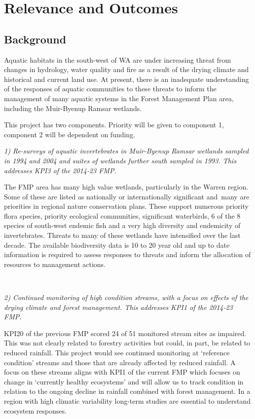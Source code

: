 \documentclass[version=last,
    paper=a4, %
    10pt, %
    usenames,
    dvipsnames,
    oneside, %
    headings=openany, %
    DIV=15 %
]{scrbook}
\begin{document}
\section*{Relevance and Outcomes}

\subsection*{Background}
Aquatic habitats in the south-west of WA are under increasing threat
from changes in hydrology, water quality and fire as a result of the
drying climate and historical and current land use. At present, there is
an inadequate understanding of the responses of aquatic communities to
these threats to inform the management of many aquatic systems in the
Forest Management Plan area, including the Muir-Byenup Ramsar wetlands.

This project has two components. Priority will be given to component 1,
component 2 will be dependent on funding.

\emph{1) Re-surveys of aquatic invertebrates in Muir-Byenup Ramsar
wetlands sampled in 1994 and 2004 and suites of wetlands further south
sampled in 1993. This addresses KPI3 of the 2014-23 FMP.}

The FMP area has many high value wetlands, particularly in the Warren
region. Some of these are listed as nationally or internationally
significant and~many are priorities in regional nature conservation
plans. These support numerous priority flora species, priority
ecological communities, significant waterbirds, 6 of the 8 species of
south-west endemic fish and a very high diversity and endemicity of
invertebrates. Threats to many of these wetlands have intensified over
the last decade. The available biodiversity data is 10 to 20 year old
and up to date information is required to assess responses to threats
and inform the allocation of resources to management actions.

~

\emph{2) Continued monitoring of high condition streams, with a focus on
effects of the drying climate and forest management. This addresses KPI1
of the 2014-23 FMP.}

KPI20 of the previous FMP scored 24 of 51 monitored stream sites as
impaired. This was not clearly related to forestry activities but could,
in part, be related to reduced rainfall. This project would see
continued monitoring at `reference condition' streams and those that are
already affected by reduced rainfall. A focus on these streams aligns
with KPI1 of the current FMP which focuses on change in `currently
healthy ecosystems' and will allow us to track condition in relation to
the ongoing decline in rainfall combined with forest management. In a
region with high climatic variability long-term studies are essential to
understand ecosystem responses.
\end{document}
